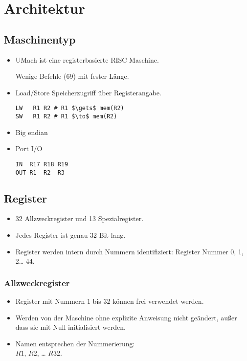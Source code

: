 \section{Architektur}

\subsection{Maschinentyp}

\begin{frame}[fragile]{\insertsubsection}
 \begin{itemize}
  \item UMach ist eine registerbasierte RISC Maschine.
        
        Wenige Befehle (69) mit fester Länge.        
  \item Load/Store Speicherzugriff über Registerangabe.
\begin{lstlisting}
LW   R1 R2 # R1 $\gets$ mem(R2)
SW   R1 R2 # R1 $\to$ mem(R2)
\end{lstlisting}
  \item Big endian
  \item Port I/O
\begin{lstlisting}
IN  R17 R18 R19
OUT R1  R2  R3
\end{lstlisting}
 \end{itemize}
\end{frame}


\subsection{Register}

\begin{frame}{\insertsubsection}
 \begin{itemize}
   \item 32 Allzweckregister und 13 Spezialregister.
   \item Jedes Register ist genau 32 Bit lang.
   \item Register werden intern durch Nummern identifiziert:
         Register Nummer 0, 1, 2\ldots{} 44.
 \end{itemize}
\end{frame}


\subsubsection{Allzweckregister}

\begin{frame}{\insertsubsubsection}
 \begin{itemize}
   \item Register mit Nummern 1 bis 32 können frei verwendet werden.
   \item Werden von der Maschine ohne explizite Anweisung nicht geändert, außer
         dass sie mit Null initialisiert werden.
   \item Namen entsprechen der Nummerierung:\\
         $R1$, $R2$, \ldots{} $R32$.
 \end{itemize}
\end{frame}



